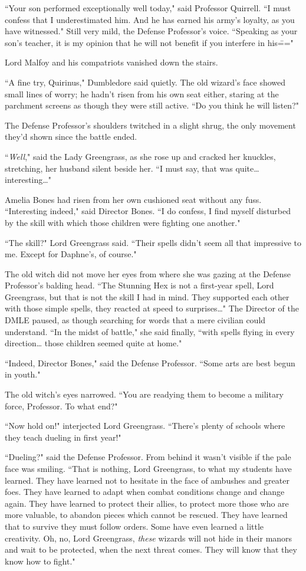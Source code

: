``Your son performed exceptionally well today," said Professor Quirrell. ``I must confess that I underestimated him. And he has earned his army's loyalty, as you have witnessed." Still very mild, the Defense Professor's voice. ``Speaking as your son's teacher, it is my opinion that he will not benefit if you interfere in his\==="

Lord Malfoy and his compatriots vanished down the stairs.

``A fine try, Quirinus," Dumbledore said quietly. The old wizard's face showed small lines of worry; he hadn't risen from his own seat either, staring at the parchment screens as though they were still active. ``Do you think he will listen?"

The Defense Professor's shoulders twitched in a slight shrug, the only movement they'd shown since the battle ended.

``\emph{Well}," said the Lady Greengrass, as she rose up and cracked her knuckles, stretching, her husband silent beside her. ``I must say, that was quite{\ldots} interesting{\ldots}"

Amelia Bones had risen from her own cushioned seat without any fuss. ``Interesting indeed," said Director Bones. ``I do confess, I find myself disturbed by the skill with which those children were fighting one another."

``The skill?" Lord Greengrass said. ``Their spells didn't seem all that impressive to me. Except for Daphne's, of course."

The old witch did not move her eyes from where she was gazing at the Defense Professor's balding head. ``The Stunning Hex is not a first-year spell, Lord Greengrass, but that is not the skill I had in mind. They supported each other with those simple spells, they reacted at speed to surprises{\ldots}" The Director of the DMLE paused, as though searching for words that a mere civilian could understand. ``In the midst of battle," she said finally, ``with spells flying in every direction{\ldots} those children seemed quite at home."

``Indeed, Director Bones," said the Defense Professor. ``Some arts are best begun in youth."

The old witch's eyes narrowed. ``You are readying them to become a military force, Professor. To what end?"

``Now hold on!" interjected Lord Greengrass. ``There's plenty of schools where they teach dueling in first year!"

``Dueling?" said the Defense Professor. From behind it wasn't visible if the pale face was smiling. ``That is nothing, Lord Greengrass, to what my students have learned. They have learned not to hesitate in the face of ambushes and greater foes. They have learned to adapt when combat conditions change and change again. They have learned to protect their allies, to protect more those who are more valuable, to abandon pieces which cannot be rescued. They have learned that to survive they must follow orders. Some have even learned a little creativity. Oh, no, Lord Greengrass, \emph{these} wizards will not hide in their manors and wait to be protected, when the next threat comes. They will know that they know how to fight."

